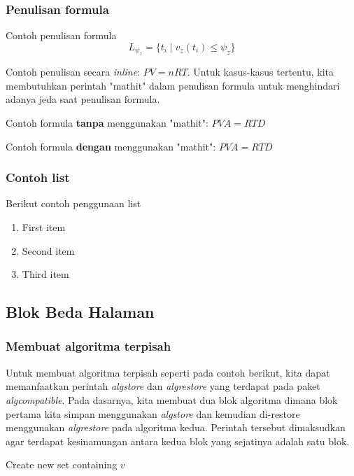 \subsubsection{Penulisan formula}
Contoh penulisan formula
\begin{equation}
	L_{\psi_z} = \{ t_i \mid v_z(t_i) \le \psi_z \}
\end{equation}

Contoh penulisan secara \textit{inline}: $\mathit{PV = nRT}$. Untuk kasus-kasus tertentu, kita membutuhkan perintah "mathit" dalam penulisan formula untuk menghindari adanya jeda saat penulisan formula.

Contoh formula \textbf{tanpa} menggunakan "mathit": $PVA = RTD$

Contoh formula \textbf{dengan} menggunakan "mathit": $\mathit{PVA = RTD}$



\subsubsection{Contoh list}
Berikut contoh penggunaan list
\begin{enumerate}
	\item First item
	\item Second item
	\item Third item
\end{enumerate}

\subsection{Blok Beda Halaman}

\subsubsection{Membuat algoritma terpisah}

Untuk membuat algoritma terpisah seperti pada contoh berikut, kita dapat memanfaatkan perintah \textit{algstore} dan \textit{algrestore} yang terdapat pada paket \textit{algcompatible}. Pada dasarnya, kita membuat dua blok algoritma dimana blok pertama kita simpan menggunakan \textit{algstore} dan kemudian di-restore menggunakan \textit{algrestore} pada algoritma kedua. Perintah tersebut dimaksudkan agar terdapat kesinamungan antara kedua blok yang sejatinya adalah satu blok. 

\begin{algorithm}                     
	\caption{Contoh algorima}          
	\label{findme}                          
	\begin{algorithmic} [1]                   
		\State Create new set containing $v$
		\EndProcedure
	\end{algorithmic}
\end{algorithm}

